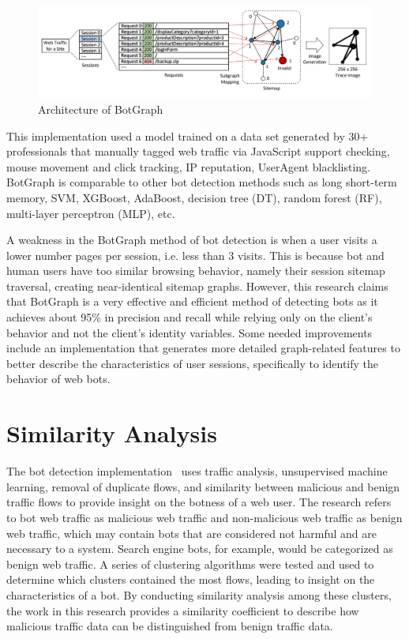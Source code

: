 \begin{figure}[!h]
    \includegraphics[width=1\columnwidth]{figures/BotGraph_fig1}
    \caption{Architecture of BotGraph}
    \label{fig:botgraph}
\end{figure}
This implementation used a model trained on a data set generated by 30+ professionals that manually tagged web traffic via JavaScript support checking, mouse movement and click tracking, IP reputation, UserAgent blacklisting.
BotGraph is comparable to other bot detection methods such as long short-term memory, SVM, XGBoost, AdaBoost, decision tree (DT), random forest (RF), multi-layer perceptron (MLP), etc.

A weakness in the BotGraph method of bot detection is when a user visits a lower number pages per session, i.e. less than 3 visits.
This is because bot and human users have too similar browsing behavior, namely their session sitemap traversal, creating near-identical sitemap graphs.
However, this research claims that BotGraph is a very effective and efficient method of detecting bots as it achieves about 95\% in precision and recall while relying only on the client's behavior and not the client's identity variables.
Some needed improvements include an implementation that generates more detailed graph-related features to better describe the characteristics of user sessions, specifically to identify the behavior of web bots.

\section{Similarity Analysis}\label{sec:similarity-analysis}
The bot detection implementation~\cite{bot_detection_wei_alvarez} uses traffic analysis, unsupervised machine learning, removal of duplicate flows, and similarity between malicious and benign traffic flows to provide insight on the botness of a web user.
The research refers to bot web traffic as malicious web traffic and non-malicious web traffic as benign web traffic, which may contain bots that are considered not harmful and are necessary to a system.
Search engine bots, for example, would be categorized as benign web traffic.
A series of clustering algorithms were tested and used to determine which clusters contained the most flows, leading to insight on the characteristics of a bot.
By conducting similarity analysis among these clusters, the work in this research provides a similarity coefficient to describe how malicious traffic data can be distinguished from benign traffic data.

